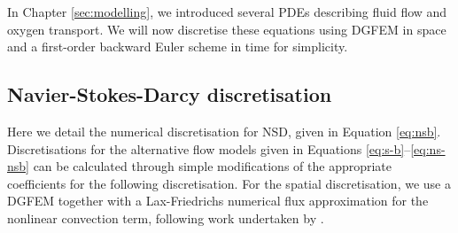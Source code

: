         In Chapter \ref{sec:modelling}, we introduced several PDEs describing fluid flow and oxygen transport. We will now discretise these equations using DGFEM in space and a first-order backward Euler scheme in time for simplicity.

        \subsection{Navier-Stokes-Darcy discretisation} \label{sec:numerical-methods:equation-discretisations:nsd}
            Here we detail the numerical discretisation for NSD, given in Equation \eqref{eq:nsb}. Discretisations for the alternative flow models given in Equations \eqref{eq:s-b}--\eqref{eq:ns-nsb} can be calculated through simple modifications of the appropriate coefficients for the following discretisation. For the spatial discretisation, we use a DGFEM together with a Lax-Friedrichs numerical flux approximation for the nonlinear convection term, following work undertaken by \citeauthor{cliffeAdaptiveDiscontinuousGalerkin2010} \cite{cliffeAdaptiveDiscontinuousGalerkin2010}. 

